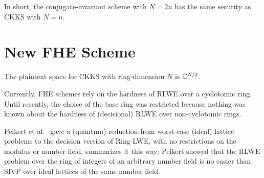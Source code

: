 \documentclass[../fheimpl.tex]{subfiles}
\begin{document}
In short, the conjugate-invariant scheme with $N=2n$ has the same security as CKKS with $N=n$.

\section{New FHE Scheme}

The plaintext space for CKKS with ring-dimension $N$ is $\mathbb{C}^{N/2}$.

Currently, FHE schemes rely on the hardness of RLWE over a cyclotomic ring. Until recently, the choice of the base ring was restricted because nothing was known about the hardness of (decisional) RLWE over non-cyclotomic rings.

Peikert et al.~\cite{cryptoeprint:2017/258} gave a (quantum) reduction from worst-case (ideal) lattice problems to the decision version of Ring-LWE, with no restrictions on the modulus or number field. \cite{cryptoeprint:2018/952} summarizes it this way: Peikert showed that the RLWE problem over the ring of integers of an arbitrary number field is no easier than SIVP over ideal lattices of the same number field.
\end{document}

